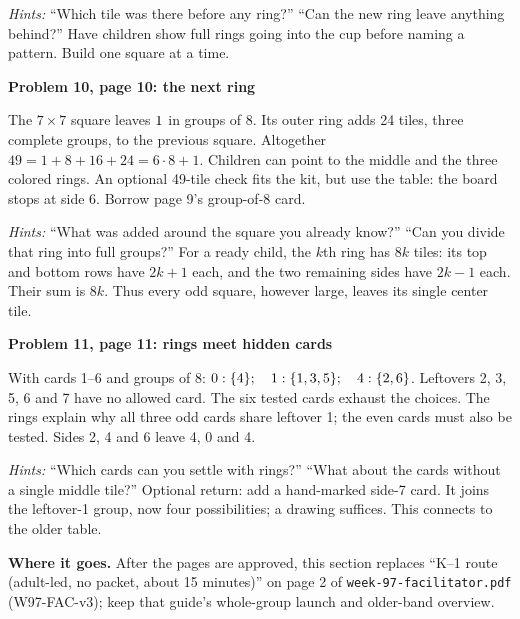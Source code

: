 \documentclass[11pt]{article}
\newcommand{\sub}[1]{\par\textbf{#1}\par}
\begin{document}
\textit{Hints:} ``Which tile was there before any ring?'' ``Can the new ring leave anything behind?'' Have children show full rings going into the cup before naming a pattern. Build one square at a time.

\sub{Problem 10, page 10: the next ring}
The $7\times7$ square leaves $1$ in groups of 8. Its outer ring adds 24 tiles, three complete groups, to the previous square. Altogether $49=1+8+16+24=6\cdot8+1$. Children can point to the middle and the three colored rings. An optional 49-tile check fits the kit, but use the table: the board stops at side 6. Borrow page 9's group-of-8 card.

\textit{Hints:} ``What was added around the square you already know?'' ``Can you divide that ring into full groups?'' For a ready child, the $k$th ring has $8k$ tiles: its top and bottom rows have $2k+1$ each, and the two remaining sides have $2k-1$ each. Their sum is $8k$. Thus every odd square, however large, leaves its single center tile.

\sub{Problem 11, page 11: rings meet hidden cards}
With cards 1--6 and groups of 8: $0:\{4\};\quad 1:\{1, 3, 5\};\quad 4:\{2, 6\}$. Leftovers 2, 3, 5, 6 and 7 have no allowed card. The six tested cards exhaust the choices. The rings explain why all three odd cards share leftover 1; the even cards must also be tested. Sides 2, 4 and 6 leave 4, 0 and 4.

\textit{Hints:} ``Which cards can you settle with rings?'' ``What about the cards without a single middle tile?'' Optional return: add a hand-marked side-7 card. It joins the leftover-1 group, now four possibilities; a drawing suffices. This connects to the older table.

\textbf{Where it goes.} After the pages are approved, this section replaces ``K--1 route (adult-led, no packet, about 15 minutes)'' on page 2 of \texttt{week-97-facilitator.pdf} (W97-FAC-v3); keep that guide's whole-group launch and older-band overview.
\end{document}
